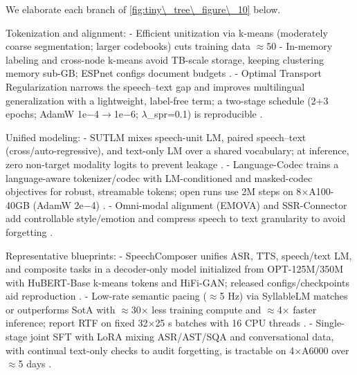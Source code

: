 \documentclass{article}
\begin{document}
We elaborate each branch of \autoref{fig:tiny\_tree\_figure\_10} below.

Tokenization and alignment:
- Efficient unitization via k-means (moderately coarse segmentation; larger codebooks) cuts training data $\approx$50%
- In-memory labeling and cross-node k-means avoid TB-scale storage, keeping clustering memory sub-GB; ESPnet configs document budgets \cite{chen2023reducingbarriersselfsupervisedlearninghu}.
- Optimal Transport Regularization narrows the speech--text gap and improves multilingual generalization with a lightweight, label-free term; a two-stage schedule (2+3 epochs; AdamW 1e$-$4$\rightarrow$1e$-$6; $\lambda$_spr=0.1) is reproducible \cite{xu2025optimaltransportregularizationspeechtext}.

Unified modeling:
- SUTLM mixes speech-unit LM, paired speech--text (cross/auto-regressive), and text-only LM over a shared vocabulary; at inference, zero non-target modality logits to prevent leakage \cite{entry2025towardjointlanguagemodelingspeechunitste,cuervo2025textspeechlanguagemodelsimprovedcrossmod,wang2024c3llmconditionalmultimodalcontentgenerat}.
- Language-Codec trains a language-aware tokenizer/codec with LM-conditioned and masked-codec objectives for robust, streamable tokens; open runs use 2M steps on 8$\times$A100-40GB (AdamW 2e$-$4) \cite{ji2025languagecodecbridgingdiscreterepresentat,kim2024enclapcombiningneuralaudiocodectextjoint,huang2024repcodecspeechrepresentationcodectokeniz}.
- Omni-modal alignment (EMOVA) and SSR-Connector add controllable style/emotion and compress speech to text granularity to avoid forgetting \cite{chen2025emovaempoweringlanguagemodelsseehearspea,tan2025ssralignmentawaremodalityconnectorspeech}.

Representative blueprints:
- SpeechComposer unifies ASR, TTS, speech/text LM, and composite tasks in a decoder-only model initialized from OPT-125M/350M with HuBERT-Base k-means tokens and HiFi-GAN; released configs/checkpoints aid reproduction \cite{wu2024speechcomposerunifyingmultiplespeechtask}.
- Low-rate semantic pacing ($\approx$5 Hz) via SyllableLM matches or outperforms SotA with $\approx$30$\times$ less training compute and $\approx$4$\times$ faster inference; report RTF on fixed 32$\times$25 s batches with 16 CPU threads \cite{baade2024syllablelmlearningcoarsesemanticunitsspe}.
- Single-stage joint SFT with LoRA mixing ASR/AST/SQA and conversational data, with continual text-only checks to audit forgetting, is tractable on 4$\times$A6000 over $\approx$5 days \cite{har-tuv2025pastphoneticacousticspeechtokenizer,hsiao2025analyzingmitigationstrategiescatastrophi}.
\end{document}
